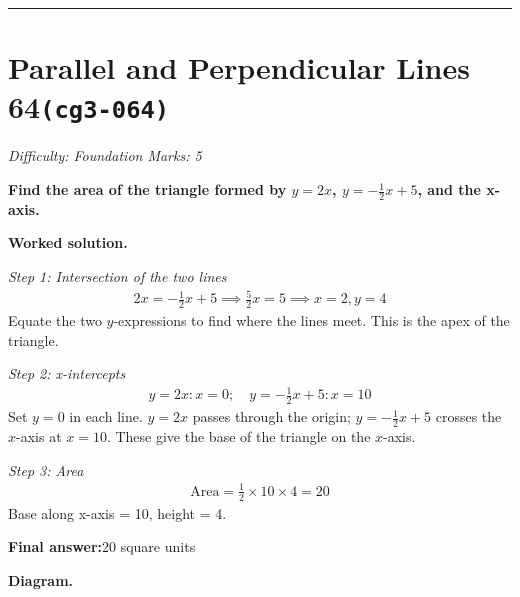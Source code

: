 \documentclass[11pt]{article}
\newcommand{\question}[1]{\par\medskip\noindent\textbf{#1}\par}
\begin{document}
\medskip\hrule

\section*{Parallel and Perpendicular Lines 64\quad\small\texttt{(cg3-064)}}
\textit{Difficulty: Foundation \quad\textbar\quad Marks: 5}

\question{Find the area of the triangle formed by \( y = 2x \), \( y = -\frac{1}{2}x + 5 \), and the x-axis.}

\textbf{Worked solution.}

\textit{Step 1: Intersection of the two lines}
\[\begin{gathered}
2x = -\frac{1}{2}x + 5 \implies \frac{5}{2}x = 5 \implies x = 2, y = 4
\end{gathered}\]
Equate the two \( y \)-expressions to find where the lines meet. This is the apex of the triangle.

\textit{Step 2: x-intercepts}
\[\begin{gathered}
y = 2x: x = 0; \quad y = -\frac{1}{2}x + 5: x = 10
\end{gathered}\]
Set \( y = 0 \) in each line. \( y = 2x \) passes through the origin; \( y = -\tfrac{1}{2}x + 5 \) crosses the \( x \)-axis at \( x = 10 \). These give the base of the triangle on the \( x \)-axis.

\textit{Step 3: Area}
\[\begin{gathered}
\text{Area} = \frac{1}{2} \times 10 \times 4 = 20
\end{gathered}\]
Base along x-axis = 10, height = 4.

\begin{answerbox}
\textbf{Final answer:}\quad \(\displaystyle 20\) square units
\end{answerbox}
\textbf{Diagram.}
\end{document}
